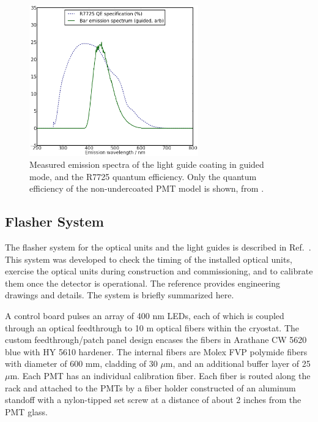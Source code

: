 \begin{figure}[t]
\centering 
\includegraphics[width=0.65\textwidth]{./light_figures/BarSpectra.png}
\caption{Measured emission spectra of the light guide coating in guided mode, and the R7725 quantum efficiency.  Only the quantum efficiency of the non-undercoated PMT model is shown, from \cite{Hamamatsu-Datasheet2inch}.
 \label{fig:TPBSpectra}  }
\end{figure}

\subsection{Flasher System}

The flasher system for the optical units and the light guides is described in Ref.~\cite{Conrad:2015xta}. This system was developed to check the timing of the installed optical units, exercise the optical units during construction and commissioning, and to calibrate them once the detector is operational.  The reference provides engineering drawings and details.  The system is briefly summarized here.

A control board pulses an array of 400 nm LEDs, each of which is
coupled through an optical feedthrough to 10 m optical fibers within the cryostat.  The custom feedthrough/patch panel design encases the fibers in Arathane CW 5620 blue with HY 5610 hardener.  The internal fibers are Molex FVP polymide fibers with diameter of 600 mm, cladding of 30 $\mu$m, and an additional buffer layer of 25 $\mu$m.  Each PMT has an individual calibration fiber.  Each fiber is routed along the rack  and attached to the PMTs by a fiber holder constructed of an aluminum standoff with a nylon-tipped set screw at a distance of about 2 inches from the PMT glass.

